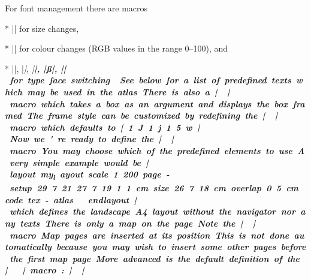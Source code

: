For font management there are macros 

\list
* |\size[#1]| for size changes,

* |\color[#1 #2 #3]| for colour changes (RGB values in the range 0--100), and

* |\rm|, |\it|, |\bf|, |\ss|, |\si| for type face switching.
\endlist


See below for a list of predefined texts which may be used in the atlas.

There is also a |\framed| macro which takes a box as an argument and displays the 
box framed. The frame style can be customized by redefining the |\linestyle| 
macro which defaults to |1 J 1 j 1.5 w|.


Now we're ready to define the |\dopage| macro. You may choose which of the 
predefined elements to use. A very simple example would be

|layout my_layout
  scale 1 200
  page-setup 29.7 21 27.7 19 1 1 cm
  size 26.7 18 cm
  overlap 0.5 cm
  code tex-atlas
    \def\dopage{\box\mapbox}
    \insertmaps 
endlayout|

which defines the landscape A4 layout without the navigator nor any texts. There 
is only a map on the page.

Note the |\insertmaps| macro. Map pages are inserted at its position. 
This is not done automatically because you may wish to insert some other pages 
before the first map page. 

More advanced is the default definition of the |\dopage| macro:

|\def\dopage{
 \vbox{\centerline{\framed{\mapbox}}
  \bigskip
  \line{
    \vbox to \ht\navbox{
      \hbox{\size[20]\the\pagelabel
        \ifpagenumbering\space(\the\pagenum)\fi
        \space\size[16]\the\pagename}
      \ifpagenumbering
        \medskip
        \hbox{\qquad\qquad
          \vtop{
            \hbox to 0pt{\hss\showpointer\pointerN\hss}
            \hbox to 0pt{\llap{\showpointer\pointerW\hskip0.7em}
              \raise1pt\hbox to 0pt{\hss$\updownarrow$\hss}
              \raise1pt\hbox to 0pt{\hss$\leftrightarrow$\hss}
              \rlap{\hskip0.7em\showpointer\pointerE}}
              \hbox to 0pt{\hss\showpointer\pointerS\hss}
          }\qquad\qquad
          \vtop{
            \def\arr{$\uparrow$}
            \showpointerlist\pointerU
            \def\arr{$\downarrow$}
            \showpointerlist\pointerD
          }
        }
      \fi
      \vss
      \scalebar
    }\hss
    \box\navbox
  }
 }
}|

